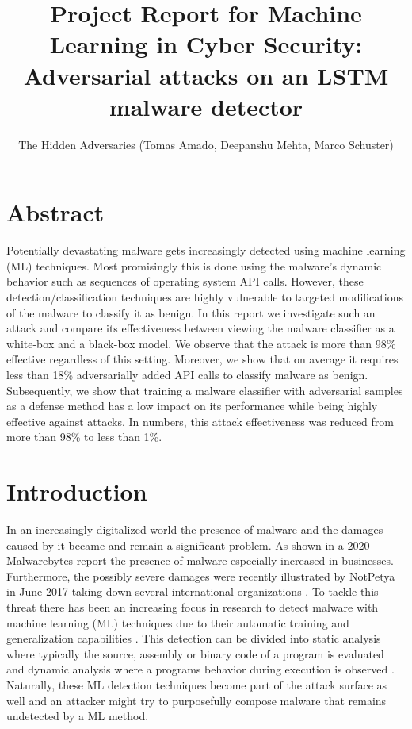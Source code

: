 \documentclass[final]{cvpr}
\title{Project Report for Machine Learning in Cyber Security:\\
\large Adversarial attacks on an LSTM malware detector}
\author{The Hidden Adversaries (Tomas Amado, Deepanshu Mehta, Marco Schuster)}
\begin{document}
\maketitle

\section*{Abstract}
Potentially devastating malware gets increasingly detected using machine 
learning (ML) techniques. Most promisingly this is done using the malware's 
dynamic behavior such as sequences of operating system API calls. However, 
these detection/classification techniques are highly vulnerable to targeted 
modifications of the malware to 
classify it as benign. In this report we investigate such an attack and compare 
its effectiveness between viewing the malware classifier as a white-box and a 
black-box model. We observe that the attack is more than 98\% effective 
regardless of this setting. Moreover, we show that on average it requires less 
than 18\% adversarially added API calls to classify malware as benign. 
Subsequently, we show that training a malware classifier with adversarial 
samples as a defense method has a low impact on its performance while being 
highly effective against attacks. In numbers, this attack effectiveness was 
reduced from more than 98\% to less than 1\%.

\section{Introduction}
In an increasingly digitalized world the presence of malware and the damages 
caused by it became and remain a significant problem. As shown in a 2020 
Malwarebytes report \autocite[6]{malware20} the presence of malware especially 
increased in businesses. Furthermore, the possibly severe damages were recently 
illustrated by NotPetya in June 2017 taking down several international 
organizations \autocite{petya}. To tackle this threat there has been an 
increasing focus in research \autocite{agrawal2018robust, Han19, 
DBLP:journals/corr/Kim2018, DBLP:journals/corr/Lu2019} to 
detect malware with machine learning (ML) techniques 
due to their automatic training and generalization capabilities 
\autocite[1]{DBLP:journals/corr/RosenbergSRE17}. This detection can be divided 
into static analysis where typically the source, assembly or binary code of a 
program is evaluated and dynamic analysis where a programs behavior during 
execution is observed \autocite[209]{Han19}. Naturally, these ML detection 
techniques become part of the attack surface as well and an attacker might try 
to purposefully compose malware that remains undetected by a ML method.
\end{document}
